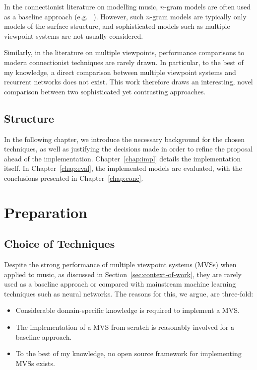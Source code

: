 \documentclass[12pt,a4paper,twoside,openright]{report}
\newcommand{\sref}[1]{Section~\ref{#1}}
\begin{document}
In the connectionist literature on modelling music, $n$-gram models are often
used as a baseline approach (e.g.\ \cite{boulanger2012modeling}
\cite{liangbachbot}). However, such $n$-gram models are typically only
models of the surface structure, and sophisticated models such as multiple
viewpoint systems are not usually considered.

Similarly, in the literature on multiple viewpoints, performance comparisons to
modern connectionist techniques are rarely drawn. In particular, to the best of
my knowledge, a direct comparison between multiple viewpoint systems and
recurrent networks does not exist. This work therefore draws an interesting, 
novel comparison between two sophisticated yet contrasting approaches.

\section{Structure}

In the following chapter, we introduce the necessary background for the chosen
techniques, as well as justifying the decisions made in order to refine the
proposal ahead of the implementation.  Chapter~\ref{chap:impl} details the
implementation itself. In Chapter~\ref{chap:eval}, the implemented models are
evaluated, with the conclusions presented in Chapter~\ref{chap:conc}.

\chapter{Preparation}

\section{Choice of Techniques}

Despite the strong performance of multiple viewpoint systems (MVSs) when applied
to music, as discussed in \sref{sec:context-of-work}, they are rarely
used as a baseline approach or compared with mainstream machine learning
techniques such as neural networks. The reasons for this, we argue, are
three-fold:
\begin{itemize}
  \item Considerable domain-specific knowledge is required to implement a MVS.
  \item The implementation of a MVS from scratch is reasonably involved for a
    baseline approach.
  \item To the best of my knowledge, no open source framework for implementing
    MVSs exists.
\end{itemize}
\end{document}

